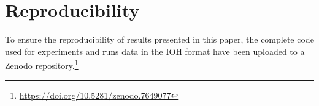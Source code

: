 \documentclass[sigconf=true, nonacm=false, review=true, anonymous = false,screen=true]{acmart}
\begin{document}
\section*{Reproducibility}
To ensure the reproducibility of results presented in this paper, the complete code used for experiments and runs data in the IOH format have been uploaded to a Zenodo repository.\footnote{\url{https://doi.org/10.5281/zenodo.7649077}}




\end{document}
